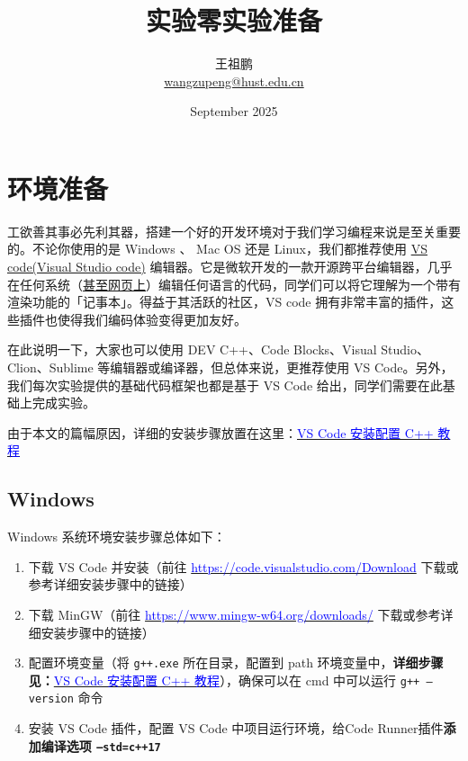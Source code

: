 \documentclass{article}
\title{\textbf{实验零\hspace{1cm}实验准备}}
\author{
\begin{tabular}{c @{\hspace{5mm}} c}
    王祖鹏 \\  %
    \href{mailto:wangzupeng@hust.edu.cn}{wangzupeng@hust.edu.cn} %
\end{tabular}
}
\date{September 2025}
\begin{document}
\maketitle


\section{环境准备}



工欲善其事必先利其器，搭建一个好的开发环境对于我们学习编程来说是至关重要的。不论你使用的是 Windows 、 Mac OS 还是 Linux，我们都推荐使用 \href{https://code.visualstudio.com/}{VS code(Visual Studio code)} 编辑器。它是微软开发的一款开源跨平台编辑器，几乎在任何系统（\href{https://vscode.dev/}{甚至网页上}）编辑任何语言的代码，同学们可以将它理解为一个带有渲染功能的「记事本」。得益于其活跃的社区，VS code 拥有非常丰富的插件，这些插件也使得我们编码体验变得更加友好。

在此说明一下，大家也可以使用 DEV C++、Code Blocks、Visual Studio、Clion、Sublime 等编辑器或编译器，但总体来说，更推荐使用 VS Code。另外，我们每次实验提供的基础代码框架也都是基于 VS Code 给出，同学们需要在此基础上完成实验。

由于本文的篇幅原因，详细的安装步骤放置在这里：\href{https://www.yuque.com/docs/share/86719be1-1e00-45d5-a96e-689d2ef10642?#hwgZt}{\textcolor{blue}{VS Code 安装配置 C++ 教程}}


\subsection{Windows}

\noindent Windows 系统环境安装步骤总体如下：
\begin{enumerate}
    \item 下载 VS Code 并安装（前往 \href{https://code.visualstudio.com/Download}{\textcolor{blue}{https://code.visualstudio.com/Download}} 下载或参考详细安装步骤中的链接）
    \item 下载 MinGW（前往 \href{https://www.mingw-w64.org/downloads/}{\textcolor{blue}{https://www.mingw-w64.org/downloads/}} 下载或参考详细安装步骤中的链接）
    \item 配置环境变量（将 \texttt{g++.exe} 所在目录，配置到 path 环境变量中，\textbf{详细步骤见：}\href{https://www.yuque.com/docs/share/86719be1-1e00-45d5-a96e-689d2ef10642?#hwgZt}{\textcolor{blue}{VS Code 安装配置 C++ 教程}}），确保可以在 cmd 中可以运行 \texttt{g++ --version} 命令
    \item 安装 VS Code 插件，配置 VS Code 中项目运行环境，给Code Runner插件\textbf{添加编译选项 \texttt{--std=c++17}}
\end{enumerate}
\end{document}
